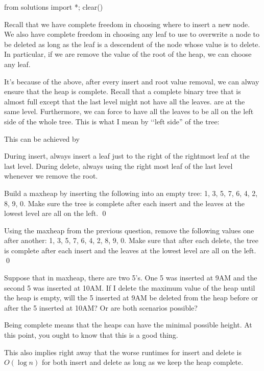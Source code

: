 \begin{python0}
from solutions import *; clear()
\end{python0}

Recall that we have complete freedom in choosing where to insert a new node.
We also have complete freedom in choosing any leaf to use to overwrite
a node to be deleted as long as the leaf is a descendent of the node whose
value is to delete.
In particular, if we are remove the value of the root of the heap,
we can choose any leaf.

It's because of the above,
after every insert and root value removal,
we can alway ensure that the heap is complete.
Recall that a complete binary tree that is almost full except that the
last level might not have all the leaves.
are at the same level.
Furthermore, we can force to have
all the leaves to be all on the left side of the whole
tree.
This is what I mean by \lq\lq left side'' of the tree:



This can be achieved by
\begin{tightlist}
\li During insert, always insert a leaf just to the right of the
rightmost leaf at the last level.
\li During delete, always using the right most leaf of the 
last level whenever we remove the root.
\end{tightlist}




\newpage
\begin{ex}
Build a maxheap by inserting the following into an empty tree:
1, 3, 5, 7, 6, 4, 2, 8, 9, 0.
Make sure the tree is complete after each insert and the leaves
at the lowest level are all on the left.
\qed
\end{ex}

\newpage
\begin{ex}
Using the maxheap from the previous question,
remove the following values one after another:
1, 3, 5, 7, 6, 4, 2, 8, 9, 0.
Make sure that after each delete, the tree is complete after each insert and the leaves
at the lowest level are all on the left.
\qed
\end{ex}

\newpage
\begin{ex}
  Suppose that in maxheap, there are two 5's.
  One 5 was inserted at 9AM and the second 5 was inserted
  at 10AM.
  If I delete the maximum value of the heap
  until the heap is empty,
  will the 5 inserted at 9AM be deleted
  from the heap
  before or after the 5 inserted at 10AM?
  Or are both scenarios possible?
\end{ex}

\newpage
Being complete means that the heaps can have the minimal possible height.
At this point, you ought to know that this is a good thing.

This also implies right away that the worse runtimes for 
insert and delete is $O(\log n)$ for both insert and delete
as long as we keep the heap complete.

